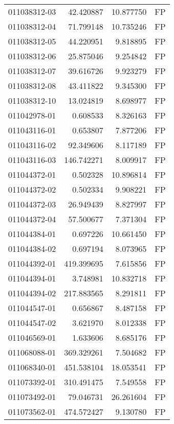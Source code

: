\begin{tabular}{lrrl}
011038312-03 &   42.420887 &      10.877750 &   FP \\
011038312-04 &   71.799148 &      10.735246 &   FP \\
011038312-05 &   44.220951 &       9.818895 &   FP \\
011038312-06 &   25.875046 &       9.254842 &   FP \\
011038312-07 &   39.616726 &       9.923279 &   FP \\
011038312-08 &   43.411822 &       9.345300 &   FP \\
011038312-10 &   13.024819 &       8.698977 &   FP \\
011042978-01 &    0.608533 &       8.326163 &   FP \\
011043116-01 &    0.653807 &       7.877206 &   FP \\
011043116-02 &   92.349606 &       8.117189 &   FP \\
011043116-03 &  146.742271 &       8.009917 &   FP \\
011044372-01 &    0.502328 &      10.896814 &   FP \\
011044372-02 &    0.502334 &       9.908221 &   FP \\
011044372-03 &   26.949439 &       8.827997 &   FP \\
011044372-04 &   57.500677 &       7.371304 &   FP \\
011044384-01 &    0.697226 &      10.661450 &   FP \\
011044384-02 &    0.697194 &       8.073965 &   FP \\
011044392-01 &  419.399695 &       7.615856 &   FP \\
011044394-01 &    3.748981 &      10.832718 &   FP \\
011044394-02 &  217.883565 &       8.291811 &   FP \\
011044547-01 &    0.656867 &       8.487158 &   FP \\
011044547-02 &    3.621970 &       8.012338 &   FP \\
011046569-01 &    1.633606 &       8.685176 &   FP \\
011068088-01 &  369.329261 &       7.504682 &   FP \\
011068340-01 &  451.538104 &      18.053541 &   FP \\
011073392-01 &  310.491475 &       7.549558 &   FP \\
011073492-01 &   79.046731 &      26.261604 &   FP \\
011073562-01 &  474.572427 &       9.130780 &   FP \\

\end{tabular}
